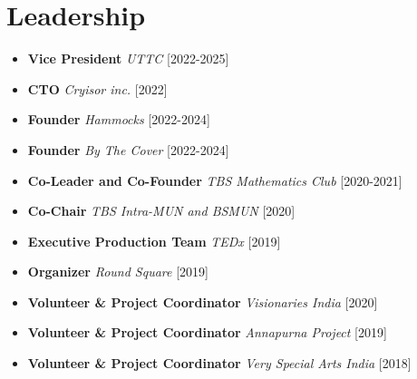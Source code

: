 \documentclass[%
               doublesided,
               paper=a4,
               fontsize=10pt
              ]{resumestyle}
\begin{document}
{    \section{Leadership}
        \begin{itemize}
            \item \textbf{Vice President} \textit{UTTC} [2022-2025]
            \item \textbf{CTO} \textit{Cryisor inc.} [2022]
            \item \textbf{Founder} \textit{Hammocks} [2022-2024]
            \item \textbf{Founder} \textit{By The Cover} [2022-2024]
            \item \textbf{Co-Leader and Co-Founder} \textit{TBS Mathematics Club} [2020-2021]
            \item \textbf{Co-Chair} \textit{TBS Intra-MUN and BSMUN} [2020]
            \item \textbf{Executive Production Team} \textit{TEDx} [2019]
            \item \textbf{Organizer} \textit{Round Square} [2019]
            \item \textbf{Volunteer \& Project Coordinator} \textit{Visionaries India} [2020]
            \item \textbf{Volunteer \& Project Coordinator} \textit{Annapurna Project} [2019]
            \item \textbf{Volunteer \& Project Coordinator} \textit{Very Special Arts India} [2018]
        \end{itemize}

        
        
        
}
\end{document}
